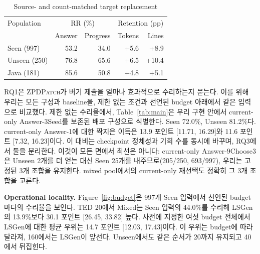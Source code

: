 \documentclass[10pt,conference]{IEEEtran}
\begin{document}
\begin{table}[h]
\caption{Source- and count-matched target replacement}
\label{tab:targets}
\centering\small
\begin{tabular}{l||rr|rr}
\toprule
Population & \multicolumn{2}{c|}{RR (\%)} & \multicolumn{2}{c}{Retention (pp)} \\
 & Answer & Progress & Tokens & Lines \\
\midrule
Seen (997) & 53.2 & 34.0 & +5.6 & +8.9 \\
Unseen (250) & 76.8 & 65.6 & +6.5 & +10.4 \\
Java (181) & 85.6 & 50.8 & +4.8 & +5.1 \\
\bottomrule
\end{tabular}
\end{table}
RQ1은 \textsc{ZPDPatch}가 버기 제출을 얼마나 효과적으로 수리하는지 묻는다. 이를 위해 우리는 모든 구성과 baseline을, 제한 없는 조건과 선언된 budget 아래에서 같은 입력으로 비교했다. 제한 없는 수리율에서, Table~\ref{tab:main}은 우리 구현 안에서 current-only Answer-3Seed를 보존된 배포 구성으로 식별한다. Seen 72.0\%, Unseen 81.2\%다. current-only Answer-1에 대한 짝지은 이득은 13.9 포인트 [11.71, 16.29]와 11.6 포인트 [7.32, 16.23]이다. 이 대비는 checkpoint 정체성과 기회 수를 동시에 바꾸며, RQ3에서 둘을 분리한다. 이것이 모든 면에서 최선은 아니다: current-only Answer-9Choose3은 Unseen 2개를 더 얻는 대신 Seen 25개를 내주므로(205/250, 693/997), 우리는 고정된 3개 조합을 유지한다. mixed pool에서의 current-only 재선택도 정확히 그 3개 조합을 고른다.

\noindent\textbf{Operational locality.} Figure~\ref{fig:budget}은 997개 Seen 입력에서 선언된 budget마다의 수리율을 보인다. TED 20에서 Mixed는 Seen 입력의 44.0\%를 수리해 LSGen의 13.9\%보다 30.1 포인트 [26.45, 33.82] 높다. 사전에 지정한 여섯 budget 전체에서 LSGen에 대한 평균 우위는 14.7 포인트 [12.03, 17.43]이다. 이 우위는 budget에 따라 달라져, 160에서는 LSGen이 앞선다. Unseen에서도 같은 순서가 20까지 유지되고 40에서 뒤집힌다.
\end{document}
